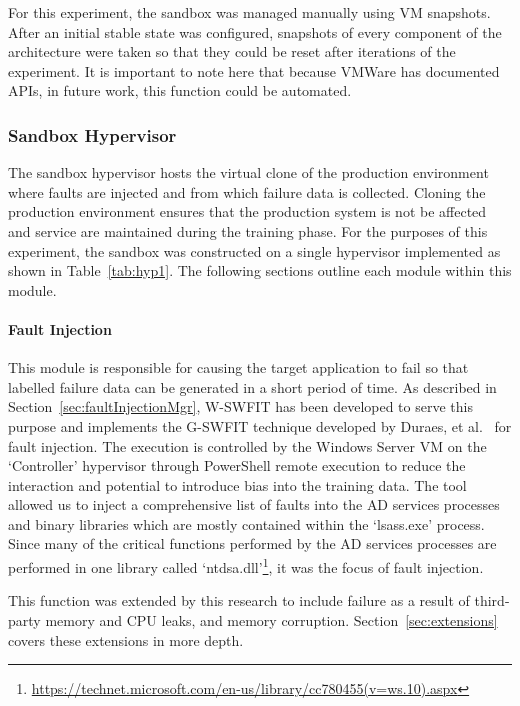 For this experiment, the sandbox was managed manually using \ac{VM} snapshots.
After an initial stable state was configured, snapshots of every component of
the architecture were taken so that they could be reset after iterations of the
experiment.  It is important to note here that because VMWare has documented
\ac{API}s, in future work, this function could be automated.

\subsubsection{Sandbox Hypervisor} \label{sec:sandbox}
The sandbox hypervisor hosts the virtual clone of the production environment
where faults are injected and from which failure data is collected.  Cloning
the production environment ensures that the production system is not be
affected and service are maintained during the training phase.  For the
purposes of this experiment, the sandbox was constructed on a single hypervisor
implemented as shown in Table~\ref{tab:hyp1}.  The following sections outline
each module within this module.

\paragraph{Fault Injection} \label{sec:faultInjectionTool} 
This module is responsible for causing the target application to fail so that
labelled failure data can be generated in a short period of time.  As described
in Section~\ref{sec:faultInjectionMgr}, \ac{W-SWFIT} has been developed to
serve this purpose and implements the \ac{G-SWFIT} technique developed by
Duraes, et al.~\cite{gswfit} for fault injection.  The execution is controlled
by the Windows Server \ac{VM} on the `Controller' hypervisor through PowerShell
remote execution to reduce the interaction and potential to introduce bias into
the training data.  The tool allowed us to inject a comprehensive list of faults
into the \ac{AD} services processes and binary libraries which are mostly
contained within the `lsass.exe' process.  Since many of the critical functions
performed by the \ac{AD} services processes are performed in one library called
`ntdsa.dll'\footnote{\url{https://technet.microsoft.com/en-us/library/cc780455(v=ws.10).aspx}},
it was the focus of fault injection.

This function was extended by this research to include failure as a result of
third-party memory and \ac{CPU} leaks, and memory corruption.
Section~\ref{sec:extensions} covers these extensions in more depth.

